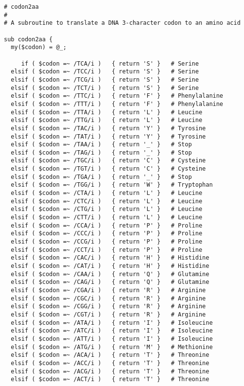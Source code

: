 \begin{lstlisting}
# codon2aa
#
# A subroutine to translate a DNA 3-character codon to an amino acid

sub codon2aa {
  my($codon) = @_;
   
     if ( $codon =~ /TCA/i )   { return 'S' }   # Serine
  elsif ( $codon =~ /TCC/i )   { return 'S' }   # Serine
  elsif ( $codon =~ /TCG/i )   { return 'S' }   # Serine
  elsif ( $codon =~ /TCT/i )   { return 'S' }   # Serine
  elsif ( $codon =~ /TTC/i )   { return 'F' }   # Phenylalanine
  elsif ( $codon =~ /TTT/i )   { return 'F' }   # Phenylalanine
  elsif ( $codon =~ /TTA/i )   { return 'L' }   # Leucine
  elsif ( $codon =~ /TTG/i )   { return 'L' }   # Leucine
  elsif ( $codon =~ /TAC/i )   { return 'Y' }   # Tyrosine
  elsif ( $codon =~ /TAT/i )   { return 'Y' }   # Tyrosine
  elsif ( $codon =~ /TAA/i )   { return '_' }   # Stop
  elsif ( $codon =~ /TAG/i )   { return '_' }   # Stop
  elsif ( $codon =~ /TGC/i )   { return 'C' }   # Cysteine
  elsif ( $codon =~ /TGT/i )   { return 'C' }   # Cysteine
  elsif ( $codon =~ /TGA/i )   { return '_' }   # Stop
  elsif ( $codon =~ /TGG/i )   { return 'W' }   # Tryptophan
  elsif ( $codon =~ /CTA/i )   { return 'L' }   # Leucine
  elsif ( $codon =~ /CTC/i )   { return 'L' }   # Leucine
  elsif ( $codon =~ /CTG/i )   { return 'L' }   # Leucine
  elsif ( $codon =~ /CTT/i )   { return 'L' }   # Leucine
  elsif ( $codon =~ /CCA/i )   { return 'P' }   # Proline
  elsif ( $codon =~ /CCC/i )   { return 'P' }   # Proline
  elsif ( $codon =~ /CCG/i )   { return 'P' }   # Proline
  elsif ( $codon =~ /CCT/i )   { return 'P' }   # Proline
  elsif ( $codon =~ /CAC/i )   { return 'H' }   # Histidine
  elsif ( $codon =~ /CAT/i )   { return 'H' }   # Histidine
  elsif ( $codon =~ /CAA/i )   { return 'Q' }   # Glutamine
  elsif ( $codon =~ /CAG/i )   { return 'Q' }   # Glutamine
  elsif ( $codon =~ /CGA/i )   { return 'R' }   # Arginine
  elsif ( $codon =~ /CGC/i )   { return 'R' }   # Arginine
  elsif ( $codon =~ /CGG/i )   { return 'R' }   # Arginine
  elsif ( $codon =~ /CGT/i )   { return 'R' }   # Arginine
  elsif ( $codon =~ /ATA/i )   { return 'I' }   # Isoleucine
  elsif ( $codon =~ /ATC/i )   { return 'I' }   # Isoleucine
  elsif ( $codon =~ /ATT/i )   { return 'I' }   # Isoleucine
  elsif ( $codon =~ /ATG/i )   { return 'M' }   # Methionine
  elsif ( $codon =~ /ACA/i )   { return 'T' }   # Threonine
  elsif ( $codon =~ /ACC/i )   { return 'T' }   # Threonine
  elsif ( $codon =~ /ACG/i )   { return 'T' }   # Threonine
  elsif ( $codon =~ /ACT/i )   { return 'T' }   # Threonine

\end{lstlisting}
